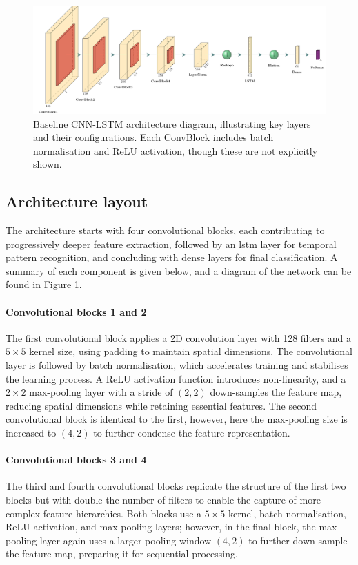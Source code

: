 \begin{figure}
    \centering
    \includegraphics[width=\linewidth]{img/ch3/architecture_diagram.pdf}
    \caption{Baseline CNN-LSTM architecture diagram, illustrating key layers and their configurations. Each ConvBlock includes batch normalisation and ReLU activation, though these are not explicitly shown.}
    \label{fig:cnn-lstm-architecture}
\end{figure}

\subsection{Architecture layout}

The architecture starts with four convolutional blocks, each contributing to progressively deeper feature extraction, followed by an \acrshort{lstm} layer for temporal pattern recognition, and concluding with dense layers for final classification. A summary of each component is given below, and a diagram of the network can be found in Figure \ref{fig:cnn-lstm-architecture}.

\paragraph{Convolutional blocks 1 and 2} The first convolutional block applies a 2D convolution layer with 128 filters and a $5\times5$ kernel size, using padding to maintain spatial dimensions. The convolutional layer is followed by batch normalisation, which accelerates training and stabilises the learning process. A ReLU activation function introduces non-linearity, and a $2\times2$ max-pooling layer with a stride of $(2,2)$ down-samples the feature map, reducing spatial dimensions while retaining essential features. The second convolutional block is identical to the first, however, here the max-pooling size is increased to $(4,2)$ to further condense the feature representation.

\paragraph{Convolutional blocks 3 and 4} The third and fourth convolutional blocks replicate the structure of the first two blocks but with double the number of filters to enable the capture of more complex feature hierarchies. Both blocks use a $5\times5$ kernel, batch normalisation, ReLU activation, and max-pooling layers; however, in the final block, the max-pooling layer again uses a larger pooling window $(4, 2)$ to further down-sample the feature map, preparing it for sequential processing.


